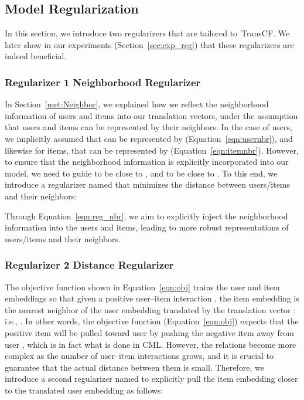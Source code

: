 \documentclass[conference]{IEEEtran}
\newcommand{\propose}{\textsf{{TransCF}}}
\begin{document}
\subsection{Model Regularization}
\vspace{-0.5ex}
In this section, we introduce two regularizers that are tailored to~\propose.
We later show in our experiments (Section~\ref{sec:exp_reg}) that these regularizers are indeed beneficial.

\medskip
\subsubsection{\textbf{Regularizer 1  Neighborhood Regularizer}}
\label{subsec:reg_nbr}
In Section~\ref{met:Neighbor}, we explained how we reflect the neighborhood information of users and items into our translation vectors, under the assumption that users and items can be represented by their neighbors. In the case of users, we implicitly assumed that  can be represented by  (Equation~\ref{eqn:usernbr}), and likewise for items, that  can be represented by  (Equation~\ref{eqn:itemnbr}).
However, to ensure that the neighborhood information is explicitly incorporated into our model, we need to guide  to be close to , and  to be close to .
To this end, we introduce a regularizer named  that minimizes the distance between users/items and their neighbors:

Through Equation~\ref{eqn:reg_nbr}, we aim to explicitly inject the neighborhood information into the users and items, leading to more robust representations of users/items and their neighbors.

\medskip
\subsubsection{\textbf{Regularizer 2  Distance Regularizer}}
\label{subsec:reg_dist}
The objective function shown in Equation~\ref{eqn:obj} trains the user and item embeddings so that given a positive user--item interaction , the item embedding  is the nearest neighbor of the user embedding  translated by the translation vector ; i.e., . 
In other words, the objective function (Equation~\ref{eqn:obj}) expects that the positive item  will be pulled toward user  by pushing the negative item  away from user , which is in fact what is done in CML.
However, the relations become more complex as the number of user--item interactions grows, and it is crucial to guarantee that the actual distance between them is small. Therefore, we introduce a second regularizer named  to explicitly pull the item embedding closer to the translated user embedding as follows:
\end{document}
